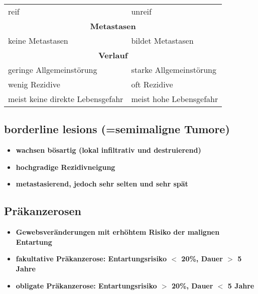 \begin{itemize}
\begin{center}
\begin{tabular}{|ll|}
						reif & unreif \\
						\multicolumn{2}{|c|}{\textbf{Metastasen}} \\
						keine Metastasen & bildet Metastasen \\
						\multicolumn{2}{|c|}{\textbf{Verlauf}} \\
						geringe Allgemeinstörung & starke Allgemeinstörung \\
						wenig Rezidive & oft Rezidive \\
						meist keine direkte Lebensgefahr & meist hohe Lebensgefahr\\
						\hline
					\end{tabular}
				\end{center}
		\end{itemize}
	\subsection{borderline lesions (=semimaligne Tumore)}
		\begin{itemize}
			\item \textbf{wachsen bösartig (lokal infiltrativ und destruierend)}
			\item \textbf{hochgradige Rezidivneigung}
			\item \textbf{metastasierend, jedoch sehr selten und sehr spät}
		\end{itemize}
	\subsection{Präkanzerosen}
		\begin{itemize}
			\item \textbf{Gewebsveränderungen mit erhöhtem Risiko der malignen Entartung}
			\item \textbf{fakultative Präkanzerose: Entartungsrisiko $<$ 20\%, Dauer $>$ 5 Jahre}
			\item \textbf{obligate Präkanzerose: Entartungsrisiko $>$ 20\%, Dauer $<$ 5 Jahre}
		\end{itemize}
\pagebreak
